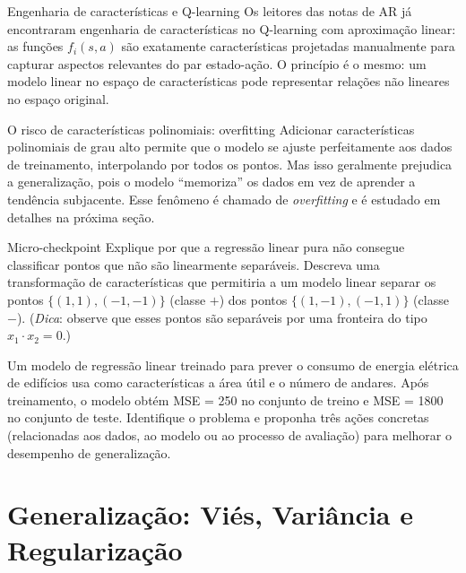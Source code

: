 \documentclass[12pt,a4paper]{article}
\begin{document}
\begin{notabox}{Engenharia de características e Q-learning}
Os leitores das notas de AR já encontraram engenharia de características no Q-learning com aproximação linear: as funções $f_i(s,a)$ são exatamente características projetadas manualmente para capturar aspectos relevantes do par estado-ação. O princípio é o mesmo: um modelo linear no espaço de características pode representar relações não lineares no espaço original.
\end{notabox}

\begin{alertabox}{O risco de características polinomiais: overfitting}
Adicionar características polinomiais de grau alto permite que o modelo se ajuste perfeitamente aos dados de treinamento, interpolando por todos os pontos. Mas isso geralmente prejudica a generalização, pois o modelo ``memoriza'' os dados em vez de aprender a tendência subjacente. Esse fenômeno é chamado de \emph{overfitting} e é estudado em detalhes na próxima seção.
\end{alertabox}

\begin{checkpointbox}{Micro-checkpoint}
Explique por que a regressão linear pura não consegue classificar pontos que não são linearmente separáveis. Descreva uma transformação de características que permitiria a um modelo linear separar os pontos $\{(1,1), (-1,-1)\}$ (classe $+$) dos pontos $\{(1,-1), (-1,1)\}$ (classe $-$). (\textit{Dica}: observe que esses pontos são separáveis por uma fronteira do tipo $x_1 \cdot x_2 = 0$.)
\end{checkpointbox}

\begin{perguntabox}
Um modelo de regressão linear treinado para prever o consumo de energia elétrica de edifícios usa como características a área útil e o número de andares. Após treinamento, o modelo obtém MSE = 250 no conjunto de treino e MSE = 1800 no conjunto de teste. Identifique o problema e proponha três ações concretas (relacionadas aos dados, ao modelo ou ao processo de avaliação) para melhorar o desempenho de generalização.
\end{perguntabox}

\section{Generalização: Viés, Variância e Regularização}
\label{sec:generalizacao}
\end{document}

